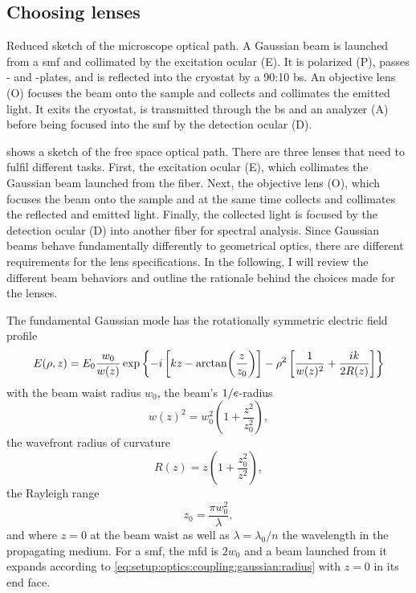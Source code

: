\subsection{Choosing lenses}\label{subsec:setup:optics:coupling:lenses}

\begin{marginfigure}
    
    \caption[]{
        Reduced sketch of the microscope optical path.
        A Gaussian beam is launched from a \gls{smf} and collimated by the excitation ocular (E).
        It is polarized (P), passes \halfwave- and \quarterwave-plates, and is reflected into the cryostat by a 90:10 \acrfull{bs}.
        An objective lens (O) focuses the beam onto the sample and collects and collimates the emitted light.
        It exits the cryostat, is transmitted through the \gls{bs} and an analyzer (A) before being focused into the \gls{smf} by the detection ocular (D).
    }
    \label{fig:setup:optics:optical_path}
\end{marginfigure}

 shows a sketch of the free space optical path.
There are three lenses that need to fulfil different tasks.
First, the excitation ocular (E), which collimates the Gaussian beam launched from the fiber.
Next, the objective lens (O), which focuses the beam onto the sample and at the same time collects and collimates the reflected and emitted light.
Finally, the collected light is focused by the detection ocular (D) into another fiber for spectral analysis.
Since Gaussian beams behave fundamentally differently to geometrical optics, there are different requirements for the lens specifications.
In the following, I will review the different beam behaviors and outline the rationale behind the choices made for the lenses.

The fundamental Gaussian  mode has the rotationally symmetric electric field profile~\cite{Yariv1989}
\begin{equation}\label{eq:setup:optics:coupling:efield:tem00}
E(\rho, z) = E_0\frac{w_0}{w(z)}\exp\left\lbrace -i\left[kz - \arctan(\frac{z}{z_0})\right] - \rho^2\left[\frac{1}{w(z)^2} + \frac{ik}{2 R(z)}\right]\right\rbrace
\end{equation}
with the beam waist radius $w_0$, the beam's $1/e$-radius
\begin{equation}\label{eq:setup:optics:coupling:gaussian:radius}
    w(z)^2 = w_0^2\left(1 + \frac{z^2}{z_0^2}\right),
\end{equation}
the wavefront radius of curvature
\begin{equation}
    R(z) = z\left(1 + \frac{z_0^2}{z^2}\right),
\end{equation}
the Rayleigh range
\begin{equation}\label{eq:setup:optics:coupling:gaussian:rayleigh_range}
    z_0 = \frac{\pi w_0^2}{\lambda},
\end{equation}
and where $z=0$ at the beam waist as well as $\lambda = \lambda_0/n$ the wavelength in the propagating medium.
For a \gls{smf}, the \gls{mfd} is $2 w_0$ and a beam launched from it expands according to \cref{eq:setup:optics:coupling:gaussian:radius} with $z=0$ in its end face.

